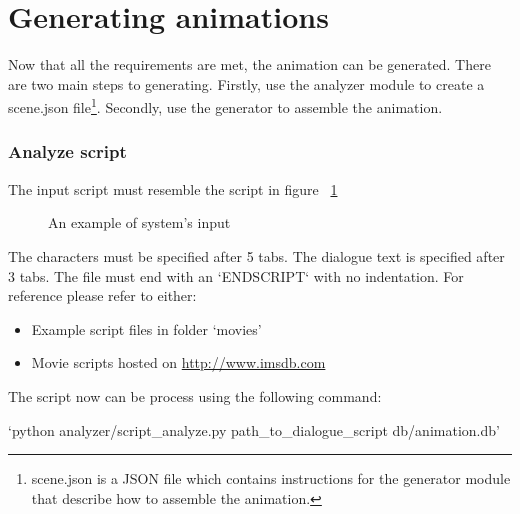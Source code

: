 \section{Generating animations \label{sec:generatormanual}}
\noindent Now that all the requirements are met, the animation can be generated. There are two main steps to generating. Firstly, use the analyzer module to create a scene.json file\footnote{scene.json is a JSON file which contains instructions for the generator module that describe how to assemble the animation.}. Secondly, use the generator to assemble the animation.

\subsubsection{Analyze script \label{sec:analyze-script}}
\noindent The input script must resemble the script in figure ~\ref{fig:inputscript2}

\begin{figure}[!ht]
	\centerline{}
	\caption{An example of system's input}\label{fig:inputscript2}
\end{figure}

\noindent The characters must be specified after 5 tabs. The dialogue text is specified after 3 tabs. The file must end with an `ENDSCRIPT` with no indentation. For reference please refer to either:
\begin{itemize}
	\item Example script files in folder `movies'
	\item Movie scripts hosted on \url{http://www.imsdb.com}
\end{itemize}

\noindent The script now can be process using the following command:

\indent `python analyzer/script\_analyze.py path\_to\_dialogue\_script db/animation.db'

